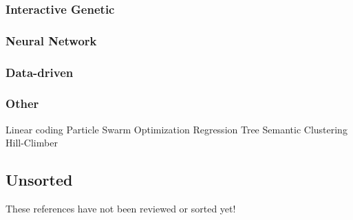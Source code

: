 \subsubsection{Interactive Genetic}
\cite{johnson1999exploring}

\subsubsection{Neural Network}
\cite{johnson2006timbre}\cite{roth2011comparison}\cite{zhang2018visualization}\cite{barkan2019deep}

\subsubsection{Data-driven}
\cite{roth2011comparison}\cite{mcartwright2014}

\subsubsection{Other}
Linear coding \cite{mintz2007toward}
Particle Swarm Optimization \cite{heise2009automatic}\cite{munoz2011opposition}
Regression Tree \cite{stowell2010making}
Semantic Clustering \cite{clement2011automatic}
Hill-Climber \cite{roth2011comparison}

\subsection{Unsorted}
These references have not been reviewed or sorted yet!

\cite{takala1993using}
\cite{hourdin1997sound}
\cite{horner1998nested}
\cite{wehn1998using}
\cite{garcia2001automatic}
\cite{dahlstedt2001creating}
\cite{garcia2001growing}
\cite{jehan2001perceptual}
\cite{su2002class}
\cite{le2002neural}
\cite{arfib2002strategies}
\cite{miranda2004crossroads}
\cite{schatter2005synaesthetic}
\cite{gounaropoulos2006synthesising}
\cite{lai2006automated}
\cite{mcdermott2007evolutionary}
\cite{yee2007automated}
\cite{yee2007evolving}
\cite{howard2007timbral}
\cite{mcdermott2008evolutionary}
\cite{yee2011automatic}
\cite{mitchell2012automated}
\cite{povscic2013controlling}
\cite{seago2013new}
\cite{krekovic2014intelligent}
\cite{macret2014automatic}
\cite{itoyama2014parameter}
\cite{huang2014active}
\cite{fasciani2016tsam}
\cite{krekovic2016algorithm}
\cite{tatar2016automatic}
\cite{yee2016use}
\cite{smith2017play}
\cite{yee2018automatic}
\cite{luke2019stochastic}
